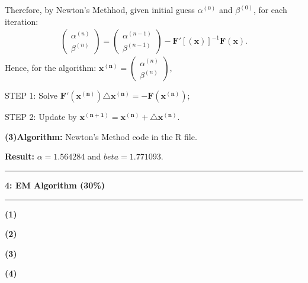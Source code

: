 \documentclass[11pt]{article}
\newcommand\question[2]{\vspace{.25in}\hrule\textbf{#1: #2}\vspace{.5em}\hrule\vspace{.10in}}
\renewcommand\part[1]{\vspace{.10in}\textbf{(#1)}}
\newcommand\algorithm{\vspace{.10in}\textbf{Algorithm: }}
\newcommand\result{\vspace{.10in}\textbf{Result: }}
\begin{document}
Therefore, by Newton's Methhod, given initial guess $\alpha^{(0)}$ and $\beta^{(0)}$, for each iteration: 
\begin{align*}
    \begin{pmatrix} \alpha^{(n)} \\ \beta^{(n)} \end{pmatrix} = \begin{pmatrix} \alpha^{(n-1)} \\ \beta^{(n-1)} \end{pmatrix} - \mathbf{F'}[(\mathbf{x})]^{-1}\mathbf{F}(\mathbf{x}).
\end{align*}
Hence, for the algorithm: $\mathbf{x^{(n)}} = \begin{pmatrix} \alpha^{(n)} \\ \beta^{(n)} \end{pmatrix}$,

STEP 1: Solve $\mathbf{F'}(\mathbf{x^{(n)}}) \mathbf{\triangle x^{(n)}} = - \mathbf{F}(\mathbf{x^{(n)}})$;

STEP 2: Update by $\mathbf{x^{(n+1)}} = \mathbf{x^{(n)}} + \mathbf{\triangle x^{(n)}}$.

\part{3}\algorithm{Newton's Method code in the R file.}

\result{$\alpha = 1.564284$ and $beta = 1.771093$.}

\question{4}{EM Algorithm (30\%)}

\part{1} 

\part{2}

\part{3}

\part{4}
\end{document}
